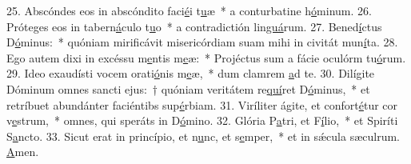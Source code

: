 25. Abscóndes eos in abscóndito faci\uline{é}i t\uline{u}æ~* a conturbatine h\uline{ó}minum.
26. Próteges eos in tabern\uline{á}culo t\uline{u}o~* a contradictión lin\uline{guá}rum.
27. Bened\uline{í}ctus D\uline{ó}minus:~* quóniam mirificávit misericórdiam suam mihi in civitát mun\uline{í}ta.
28. Ego autem dixi in excéssu m\uline{e}ntis m\uline{e}æ:~* Projéctus sum a fácie oculórm tu\uline{ó}rum.
29. Ideo exaudísti vocem orati\uline{ó}nis m\uline{e}æ,~* dum clamrem \uline{a}d te.
30. Dilígite Dóminum omnes sancti ejus:~† quóniam veritátem re\uline{quí}ret D\uline{ó}minus,~* et retríbuet abundánter faciéntibs sup\uline{é}rbiam.
31. Viríliter ágite, et confort\uline{é}tur cor v\uline{e}strum,~* omnes, qui speráts in D\uline{ó}mino.
32. Glória P\uline{a}tri, et F\uline{í}lio,~* et Spiríti S\uline{a}ncto.
33. Sicut erat in princípio, et n\uline{u}nc, et s\uline{e}mper,~* et in sǽcula sæculrum. \uline{A}men.
